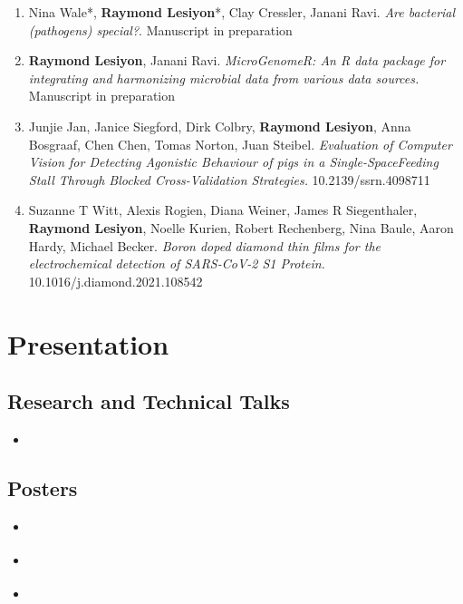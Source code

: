 \documentclass[12pt,a4paper,sans]{moderncv} %
\begin{document}
\begin{enumerate}
    \item Nina Wale*, \textbf{Raymond Lesiyon}*, Clay Cressler, Janani Ravi. \textit{Are bacterial (pathogens) special?}. Manuscript in preparation
    \item \textbf{Raymond Lesiyon}, Janani Ravi. \textit{MicroGenomeR: An R data package for integrating and harmonizing microbial data from various data sources.} Manuscript in preparation
    \item Junjie Jan, Janice Siegford, Dirk Colbry, \textbf{Raymond Lesiyon}, Anna Bosgraaf, Chen Chen, Tomas Norton, Juan Steibel. \textit{Evaluation of Computer Vision for Detecting Agonistic Behaviour of pigs in a Single-SpaceFeeding Stall Through Blocked Cross-Validation Strategies.} 10.2139/ssrn.4098711
    \item Suzanne T Witt, Alexis Rogien, Diana Weiner, James R Siegenthaler, \textbf{Raymond Lesiyon}, Noelle Kurien, Robert Rechenberg, Nina Baule, Aaron Hardy, Michael Becker. \textit{Boron doped diamond thin films for the electrochemical detection of SARS-CoV-2 S1 Protein.} 10.1016/j.diamond.2021.108542
\end{enumerate}


\section{Presentation}

\subsection{Research and Technical Talks} 
{
    \begin{itemize}
        \item { }
    \end{itemize}
}

\subsection{Posters} 
{
    \begin{itemize}
        \item { }
        \item { }
        \item { }
    \end{itemize}
}
\end{document}
